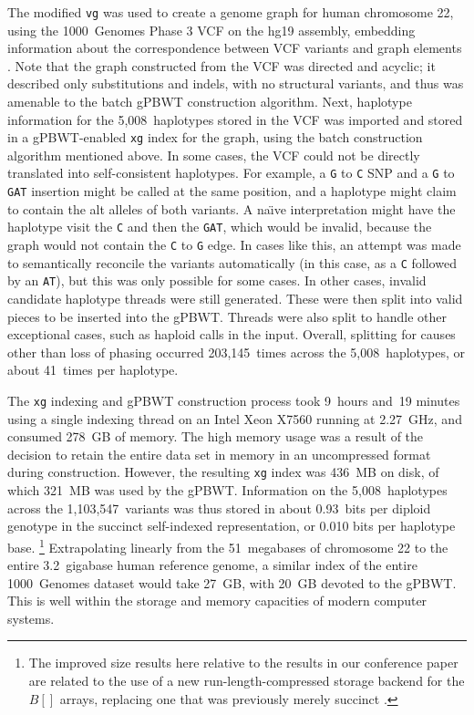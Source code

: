 The modified \texttt{vg} was used to create a genome graph for human chromosome 22, using the 1000~Genomes Phase 3 VCF on the hg19 assembly, embedding information about the correspondence between VCF variants and graph elements \cite{10002015global}. Note that the graph constructed from the VCF was directed and acyclic; it described only substitutions and indels, with no structural variants, and thus was amenable to the batch gPBWT construction algorithm. Next, haplotype information for the 5,008~haplotypes stored in the VCF was imported and stored in a gPBWT-enabled \texttt{xg} index for the graph, using the batch construction algorithm mentioned above. In some cases, the VCF could not be directly translated into self-consistent haplotypes. For example, a \texttt{G} to \texttt{C} SNP and a \texttt{G} to \texttt{GAT} insertion might be called at the same position, and a haplotype might claim to contain the alt alleles of both variants. A na\"{\i}ve interpretation might have the haplotype visit the \texttt{C} and then the \texttt{GAT}, which would be invalid, because the graph would not contain the \texttt{C} to \texttt{G} edge. In cases like this, an attempt was made to semantically reconcile the variants automatically (in this case, as a \texttt{C} followed by an \texttt{AT}), but this was only possible for some cases. In other cases, invalid candidate haplotype threads were still generated. These were then split into valid pieces to be inserted into the gPBWT. Threads were also split to handle other exceptional cases, such as haploid calls in the input. Overall, splitting for causes other than loss of phasing occurred 203,145~times across the 5,008~haplotypes, or about 41~times per haplotype.

The \texttt{xg} indexing and gPBWT construction process took 9~hours and~19 minutes using a single indexing thread on an Intel Xeon X7560 running at 2.27~GHz, and consumed 278~GB of memory. The high memory usage was a result of the decision to retain the entire data set in memory in an uncompressed format during construction. However, the resulting \texttt{xg} index was 436~MB on disk, of which  321~MB was used by the gPBWT. Information on the 5,008~haplotypes across the 1,103,547~variants was thus stored in about 0.93~bits per diploid genotype in the succinct self-indexed representation, or 0.010 bits per haplotype base. \footnote{The improved size results here relative to the results in our conference paper are related to the use of a new run-length-compressed storage backend for the $B[]$ arrays, replacing one that was previously merely succinct \cite{novak2016graph}.} Extrapolating linearly from the 51~megabases of chromosome 22 to the entire 3.2~gigabase human reference genome, a similar index of the entire 1000~Genomes dataset would take 27~GB, with 20~GB devoted to the gPBWT. This is well within the storage and memory capacities of modern computer systems.

